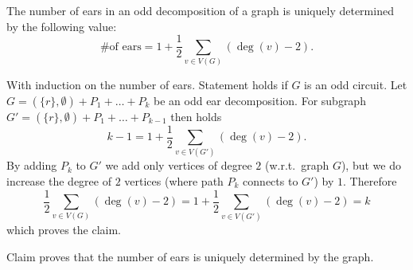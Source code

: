 \newcommand{\sheet}{2}




\maketitle

\begin{exercise}{1}
    \begin{claim}
        The number of ears in an odd decomposition of a graph is uniquely
        determined by the following value:
        \[
            \text{\# of ears} = 1 + \frac{1}{2} \sum_{v \in V(G)} (\deg(v) - 2).
        \]
    \end{claim}
    \begin{proof_claim}
        With induction on the number of ears. Statement holds if $G$
    is an odd circuit. Let $G = (\{r\}, \emptyset) + P_1 + \ldots + P_k$ be an
    odd ear decomposition. For subgraph $G' = (\{r\}, \emptyset) + P_1 + \ldots
    + P_{k-1}$ then holds 
    \[
        k - 1 = 1 + \frac{1}{2} \sum_{v \in V(G')} (\deg(v) - 2).
    \]
    By adding $P_k$ to $G'$ we add only vertices of degree $2$ (w.r.t.\ graph
    $G$), but we do increase the degree of $2$ vertices (where path $P_k$
    connects to $G'$) by $1$. Therefore
    \begin{equation*}
        \frac{1}{2} \sum_{v \in V(G)} (\deg(v) - 2) = 1 + \frac{1}{2} \sum_{v
        \in V(G')} (\deg(v) - 2) = k
    \end{equation*}
    which proves the claim.
    \end{proof_claim}

    Claim proves that the number of ears is uniquely determined by the graph.
\end{exercise}

